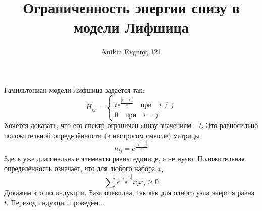 \documentclass{article}
\title{Ограниченность энергии снизу в модели Лифшица}
\author{Anikin Evgeny, 121}
\begin{document}
\maketitle
    Гамильтониан модели Лифшица задаётся так:
    \begin{equation}
        H_{ij} = \left\{\begin{matrix}
                    t e^{\frac{|r_i - r_j|}{a}} \quad \text{при} \quad i\ne j \\
                    0 \quad \text{при} \quad i = j
                 \end{matrix}\right.
    \end{equation}
    Хочется доказать, что его спектр ограничен cнизу значением $-t$. Это равносильно положительной 
    определённости (в нестрогом смысле) матрицы
    \begin{equation}
        h_{ij} = e^{\frac{|r_i - r_j|}{a}}
    \end{equation}
    Здесь уже диагональные элементы равны единице, а не нулю. Положительная определённость означает,
    что для любого набора $x_i$ 
    \begin{equation}
        \sum e^{\frac{|r_i - r_j|}{a}} x_i x_j \ge 0
    \end{equation}
    Докажем это по индукции. База очевидна, так как для одного узла энергия равна $t$. Переход
    индукции проведём...
\end{document}
